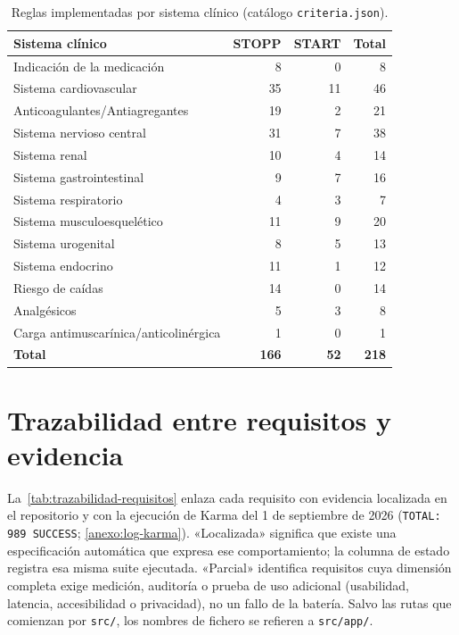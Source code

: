 \begin{table}[H]
  \centering
  \scriptsize
  \begin{tabular}{@{}lrrr@{}}
    \toprule
    \textbf{Sistema clínico} & \textbf{STOPP} & \textbf{START} & \textbf{Total} \\
    \midrule
    Indicación de la medicación                    &   8 &  0 &   8 \\
    Sistema cardiovascular                         &  35 & 11 &  46 \\
    Anticoagulantes/Antiagregantes                 &  19 &  2 &  21 \\
    Sistema nervioso central                       &  31 &  7 &  38 \\
    Sistema renal                                  &  10 &  4 &  14 \\
    Sistema gastrointestinal                       &   9 &  7 &  16 \\
    Sistema respiratorio                           &   4 &  3 &   7 \\
    Sistema musculoesquelético                     &  11 &  9 &  20 \\
    Sistema urogenital                             &   8 &  5 &  13 \\
    Sistema endocrino                              &  11 &  1 &  12 \\
    Riesgo de caídas                               &  14 &  0 &  14 \\
    Analgésicos                                    &   5 &  3 &   8 \\
    Carga antimuscarínica/anticolinérgica          &   1 &  0 &   1 \\
    \midrule
    \textbf{Total}                                 & \textbf{166} & \textbf{52} & \textbf{218} \\
    \bottomrule
  \end{tabular}
  \caption{Reglas implementadas por sistema clínico (catálogo
    \texttt{criteria.json}).}
  \label{tab:sistemas-criterios}
\end{table}

\chapter{Trazabilidad entre requisitos y evidencia}
\label{anexo:trazabilidad}

La~\cref{tab:trazabilidad-requisitos} enlaza cada requisito con evidencia
localizada en el repositorio y con la ejecución de Karma del
1 de septiembre de 2026 (\texttt{TOTAL: 989 SUCCESS};
\cref{anexo:log-karma}). «Localizada» significa que existe una
especificación automática que expresa ese comportamiento; la columna de
estado registra esa misma suite ejecutada. «Parcial» identifica requisitos
cuya dimensión completa exige medición, auditoría o prueba de uso adicional
(usabilidad, latencia, accesibilidad o privacidad), no un fallo de la
batería. Salvo las rutas que comienzan por
\texttt{src/}, los nombres de fichero se refieren a \texttt{src/app/}.

